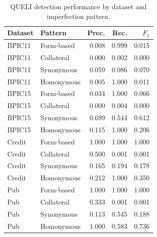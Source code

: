 \begin{table}[t]
  \centering
  \caption{QUELI detection performance by dataset and imperfection pattern.}
  \label{tab:queli-per-pattern}
  \small
  \setlength{\tabcolsep}{6pt}
  \begin{tabular}{llrrr}
    \toprule
    Dataset & Pattern & Prec. & Rec. & $F_1$ \\
    \midrule
    BPIC11 & Form-based & 0.008 & 0.999 & 0.015 \\
    BPIC11 & Collateral & 0.000 & 0.002 & 0.000 \\
    BPIC11 & Synonymous & 0.059 & 0.086 & 0.070 \\
    BPIC11 & Homonymous & 0.005 & 1.000 & 0.011 \\
    \addlinespace
    BPIC15 & Form-based & 0.034 & 1.000 & 0.066 \\
    BPIC15 & Collateral & 0.000 & 0.004 & 0.000 \\
    BPIC15 & Synonymous & 0.699 & 0.544 & 0.612 \\
    BPIC15 & Homonymous & 0.115 & 1.000 & 0.206 \\
    \addlinespace
    Credit & Form-based & 1.000 & 1.000 & 1.000 \\
    Credit & Collateral & 0.500 & 0.001 & 0.001 \\
    Credit & Synonymous & 0.165 & 0.194 & 0.178 \\
    Credit & Homonymous & 0.212 & 1.000 & 0.350 \\
    \addlinespace
    Pub & Form-based & 1.000 & 1.000 & 1.000 \\
    Pub & Collateral & 0.333 & 0.001 & 0.001 \\
    Pub & Synonymous & 0.113 & 0.545 & 0.188 \\
    Pub & Homonymous & 1.000 & 0.583 & 0.736 \\
    \bottomrule
  \end{tabular}
\end{table}
